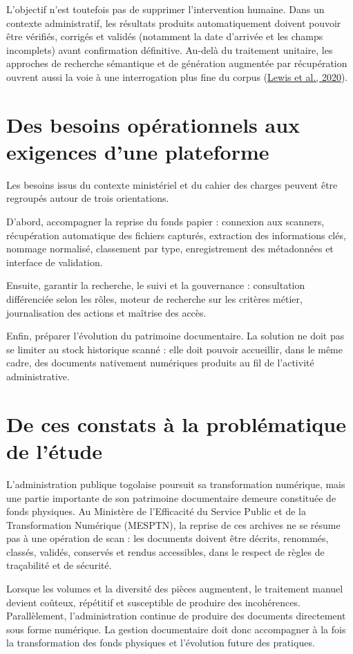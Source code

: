 \documentclass[12pt,a4paper]{report}
\newcommand{\citer}[2]{\hyperref[ref:#1]{#2}}
\newcommand{\nomMinistere}{Ministère de l'Efficacité du Service Public et de la Transformation Numérique (MESPTN)}
\begin{document}
L'objectif n'est toutefois pas de supprimer l'intervention humaine. Dans un contexte administratif, les résultats produits automatiquement doivent pouvoir être vérifiés, corrigés et validés (notamment la date d'arrivée et les champs incomplets) avant confirmation définitive. Au-delà du traitement unitaire, les approches de recherche sémantique et de génération augmentée par récupération ouvrent aussi la voie à une interrogation plus fine du corpus (\citer{lewis2020}{Lewis et al., 2020}).

\section{Des besoins opérationnels aux exigences d'une plateforme}
Les besoins issus du contexte ministériel et du cahier des charges peuvent être regroupés autour de trois orientations.

D'abord, accompagner la reprise du fonds papier : connexion aux scanners, récupération automatique des fichiers capturés, extraction des informations clés, nommage normalisé, classement par type, enregistrement des métadonnées et interface de validation.

Ensuite, garantir la recherche, le suivi et la gouvernance : consultation différenciée selon les rôles, moteur de recherche sur les critères métier, journalisation des actions et maîtrise des accès.

Enfin, préparer l'évolution du patrimoine documentaire. La solution ne doit pas se limiter au stock historique scanné : elle doit pouvoir accueillir, dans le même cadre, des documents nativement numériques produits au fil de l'activité administrative.

\section{De ces constats à la problématique de l'étude}
L'administration publique togolaise poursuit sa transformation numérique, mais une partie importante de son patrimoine documentaire demeure constituée de fonds physiques. Au \nomMinistere{}, la reprise de ces archives ne se résume pas à une opération de scan : les documents doivent être décrits, renommés, classés, validés, conservés et rendus accessibles, dans le respect de règles de traçabilité et de sécurité.

Lorsque les volumes et la diversité des pièces augmentent, le traitement manuel devient coûteux, répétitif et susceptible de produire des incohérences. Parallèlement, l'administration continue de produire des documents directement sous forme numérique. La gestion documentaire doit donc accompagner à la fois la transformation des fonds physiques et l'évolution future des pratiques.
\end{document}
